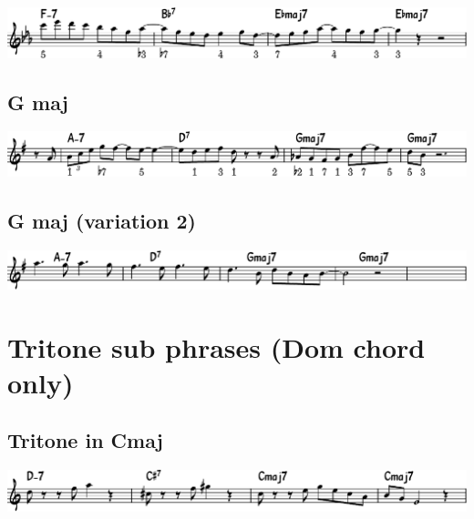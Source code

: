 \documentclass[11pt]{article}
\begin{document}
\begin{center}
\includegraphics[width=.98\linewidth]{e-flat.pdf}
\end{center}

\subsection*{G maj}
\label{sec:orgaa11690}
\begin{center}
\includegraphics[width=.98\linewidth]{g_maj.pdf}
\end{center}

\subsection*{G maj (variation 2)}
\label{sec:org726b3fd}
\begin{center}
\includegraphics[width=.98\linewidth]{g_maj_v2.pdf}
\end{center}

\section*{Tritone sub phrases (Dom chord only)}
\label{sec:org2c034a2}

\subsection*{Tritone in Cmaj}
\label{sec:orgb801111}
\begin{center}
\includegraphics[width=.98\linewidth]{tritone-c-maj.pdf}
\end{center}
\end{document}

